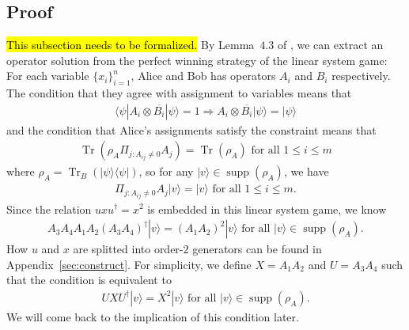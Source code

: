 \documentclass[11pt,letterpaper]{article}
\newcommand{\ket}[1]{|#1\rangle}
\newcommand{\bra}[1]{\langle#1|}
\newcommand{\ketbra}[2]{|#1\rangle\langle#2|}
\DeclareMathOperator{\Tr}{Tr}
\DeclareMathOperator{\supp}{supp}
\newcommand{\1}{\mathbb{1}}
\theoremstyle{definition}
\begin{document}
\subsection{Proof}
\hl{This subsection needs to be formalized.}
By Lemma~$4.3$ of \cite{coladan2017}, we can extract an operator solution from the perfect winning strategy 
of the linear system game: 
For each variable $\{ x_i \}_{i=1}^n$, Alice and Bob has operators $A_i$ and $B_i$ respectively.
The condition that they agree with assignment to variables means that 
\begin{align}
	\bra{\psi} A_i \otimes \overline{B_i} \ket{\psi} = 1 \Rightarrow A_i \otimes \overline{B_i} \ket{\psi} = \ket{\psi}
\end{align}
and the condition that Alice's assignments satisfy the constraint means that 
\begin{align}
	\Tr(\rho_A \Pi_{j: A_{ij} \neq 0} A_j) = \Tr(\rho_A) \text{ for all } 1 \leq i \leq m
\end{align}
where $\rho_A =  \Tr_B(\ketbra{\psi}{\psi})$, so for  any $\ket{v} \in \supp(\rho_A)$,
we have 
\begin{align}
\Pi_{j:A_{ij} \neq 0} A_j \ket{v} = \ket{v} \text{ for all } 1 \leq i \leq m.
\end{align}
Since the relation $uxu^\dagger = x^2$ is embedded in this linear system game, we know
\begin{align}
	A_3A_4 A_1A_2 (A_3A_4)^\dagger \ket{v}= (A_1A_2)^2 \ket{v} \text{ for all } \ket{v} \in \supp(\rho_A).
\end{align}
How $u$ and $x$ are splitted into order-$2$ generators can be found in Appendix~\ref{sec:construct}.
For simplicity, we define $X = A_1A_2$ and $U=A_3A_4$ such that
the condition is equivalent to
\begin{align}
	\label{eq:ux_relation}
	UXU^\dagger \ket{v} = X^2 \ket{v} \text{ for all } \ket{v} \in \supp(\rho_A).
\end{align}
We will come back to the implication of this condition later.
\end{document}

